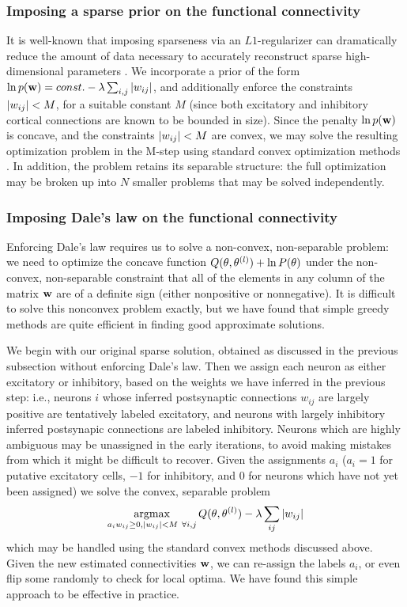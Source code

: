 \subsubsection{Imposing a sparse prior on the functional connectivity}

It is well-known that imposing sparseness via an $L1$-regularizer can dramatically reduce the amount of data necessary to accurately reconstruct sparse high-dimensional parameters \cite{Tibs96,TIP01,DE03,NG04,Candes2005,Mishchenko2009}. We incorporate a prior of the form $\ln p(\mathbf{w}) = const. - \lambda \sum_{i,j} |w_{ij}|$, and additionally enforce the constraints $|w_{ij}|<M$, for a suitable constant $M$ (since both excitatory and inhibitory cortical connections are known to be bounded in size). Since the penalty $\ln p(\mathbf{w})$ is concave, and the constraints $|w_{ij}|<M$ are convex, we may solve the resulting optimization problem in the M-step using standard convex optimization methods \cite{CONV04}. In addition, the problem retains its separable structure: the full optimization may be broken up into $N$ smaller problems that may be solved independently.

\subsubsection{Imposing Dale's law on the functional connectivity}

Enforcing Dale's law requires us to solve a non-convex, non-separable problem: we need to optimize the concave function $Q(\mathbf{\theta},\mathbf{\theta}^{(l)}) + \ln P(\mathbf{\theta})$ under the non-convex, non-separable constraint that all of the elements in any column of the matrix $\mathbf{w}$ are of a definite sign (either nonpositive or nonnegative). It is difficult to solve this nonconvex problem exactly, but we have found that simple greedy methods are quite efficient in finding good approximate solutions.

We begin with our original sparse solution, obtained as discussed in the previous subsection without enforcing Dale's law. Then we assign each neuron as either excitatory or inhibitory, based on the weights we have inferred in the previous step: i.e., neurons $i$ whose inferred postsynaptic connections $w_{ij}$ are largely positive are tentatively labeled excitatory, and neurons with largely inhibitory inferred postsynapic connections are labeled inhibitory. Neurons which are highly ambiguous may be unassigned in the early iterations, to avoid making mistakes from which it might be difficult to recover. Given the assignments $a_i$ ($a_i =1$ for putative excitatory cells, $-1$ for inhibitory, and $0$ for neurons which have not yet been assigned) we solve the convex, separable problem \begin{equation} \argmax_{\substack{a_i \w_{ij} \geq 0, |w_{ij}|<M ~ \forall i,j}} Q(\bth,\bth^{(l)}) - \lambda \sum_{ij} |w_{ij}| \end{equation} which may be handled using the standard convex methods discussed above. Given the new estimated connectivities $\mathbf{w}$, we can re-assign the labels $a_i$, or even flip some randomly to check for local optima. We have found this simple approach to be effective in practice.


